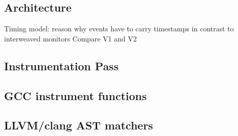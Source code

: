 \subsection{Architecture}
\label{sec:implementation:tesslaserver:architecture}

Timing model: reason why events have to carry timestamps in contrast to interweaved monitors
Compare V1 and V2
\subsection{Instrumentation Pass}
\label{sec:implementation:instrumentation}


\subsection{GCC instrument functions}
\subsection{LLVM/clang AST matchers}
